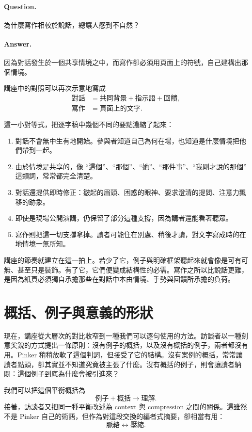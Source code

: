 \paragraph{Question.} 為什麼寫作相較於說話，總讓人感到不自然？

\paragraph{Answer.} 因為對話發生於一個共享情境之中，而寫作卻必須用頁面上的符號，自己建構出那個情境。

講座中的對照可以再次示意地寫成
\begin{align}
\text{對話} &= \text{共同背景} + \text{指示語} + \text{回饋}, \\
\text{寫作} &= \text{頁面上的文字}.
\end{align}

這一小對等式，把逐字稿中幾個不同的要點濃縮了起來：
\begin{enumerate}
\item 對話不會無中生有地開始。參與者知道自己為何在場，也知道是什麼情境把他們帶到一起。
\item 由於情境是共享的，像 ``這個''、``那個''、``她''、``那件事''、``我剛才說的那個'' 這類詞，常常都完全清楚。
\item 對話還提供即時修正：皺起的眉頭、困惑的眼神、要求澄清的提問、注意力飄移的跡象。
\item 即使是現場公開演講，仍保留了部分這種支撐，因為講者還能看著聽眾。
\item 寫作則把這一切支撐拿掉。讀者可能住在別處、稍後才讀，對文字寫成時的在地情境一無所知。
\end{enumerate}

講座的節奏就建立在這一拍上。若少了它，例子與明確框架聽起來就會像是可有可無、甚至只是裝飾。有了它，它們便變成結構性的必需。寫作之所以比說話更難，是因為紙頁必須獨自承擔那些在對話中本由情境、手勢與回饋所承擔的負荷。

\section{概括、例子與意義的形狀}

現在，講座從大層次的對比收窄到一種我們可以逐句使用的方法。訪談者以一種刻意尖銳的方式提出一條原則：沒有例子的概括，以及沒有概括的例子，兩者都沒有用。Pinker 稍稍放軟了這個判詞，但接受了它的結構。沒有案例的概括，常常讓讀者點頭，卻其實並不知道究竟被主張了什麼。沒有概括的例子，則會讓讀者納悶：這個例子到底為什麼會被引進來？

我們可以把這個平衡概括為
\begin{equation}
\text{例子} + \text{概括} \to \text{理解}.
\end{equation}
接著，訪談者又把同一種平衡改述為 context 與 compression 之間的關係。這雖然不是 Pinker 自己的術語，但作為對這段交換的編者式摘要，卻相當有用：
\begin{equation}
\text{脈絡} \leftrightarrow \text{壓縮}.
\end{equation}

